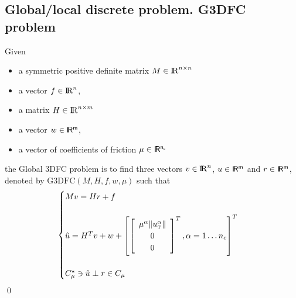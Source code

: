 \documentclass[a4paper,10pt]{article}
\begin{document}
\subsection{Global/local discrete problem. G3DFC problem}
\begin{definition}
  Given
  \begin{itemize}
    \item a symmetric positive definite matrix ${M} \in \mathrm{I\!R}^{n \times n}$
    \item a vector $ {f} \in \mathrm{I\!R}^n$,
    \item a matrix  ${H} \in \mathrm{I\!R}^{n \times m}$
    \item a vector $w \in \rm\sf I\!R^{m}$,
    \item a vector of coefficients of friction $\mu \in \rm\sf I\!R^{n_c}$
  \end{itemize}
 the Global 3DFC problem  is to find three vectors $ {v} \in \mathrm{I\!R}^n$, $u\in\rm\sf I\!R^m$ and $r\in \rm\sf I\!R^m$, denoted by $\mathrm{G3DFC}(M,H,f,w,\mu)$  such that
\begin{equation}\label{eq:lcp1}
  \begin{cases}
    M v = {H} {r} + {f} \\ \\
    \hat u = H^T v + w +\left[
      \left[\begin{array}{c}
        \mu^\alpha \|u^\alpha_{\hbox{\tiny{T}}}\|\\
        0 \\
        0
      \end{array}\right]^T, \alpha = 1 \ldots n_c
\right]^T \\ \\
    C^\star_{\mu} \ni {\hat u} \perp r \in C_{\mu}
  \end{cases}
\end{equation}
\qed
\end{definition}
\end{document}
